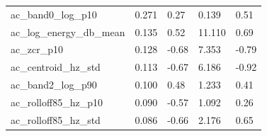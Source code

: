 \documentclass[11pt,a4paper]{article}
\begin{document}
\begin{center}
\begin{longtable}{>{\raggedright\arraybackslash}p{4.20cm}>{\raggedleft\arraybackslash}p{2.55cm}>{\raggedleft\arraybackslash}p{2.55cm}>{\raggedleft\arraybackslash}p{2.55cm}>{\raggedleft\arraybackslash}p{2.55cm}}
\hspace{0pt}ac\_\allowbreak{}band0\_\allowbreak{}log\_\allowbreak{}p10 & \hspace{0pt}0.271 & \hspace{0pt}0.27 & \hspace{0pt}0.139 & \hspace{0pt}0.51\\
\hspace{0pt}ac\_\allowbreak{}log\_\allowbreak{}energy\_\allowbreak{}db\_\allowbreak{}mean & \hspace{0pt}0.135 & \hspace{0pt}0.52 & \hspace{0pt}11.110 & \hspace{0pt}0.69\\
\hspace{0pt}ac\_\allowbreak{}zcr\_\allowbreak{}p10 & \hspace{0pt}0.128 & \hspace{0pt}-0.68 & \hspace{0pt}7.353 & \hspace{0pt}-0.79\\
\hspace{0pt}ac\_\allowbreak{}centroid\_\allowbreak{}hz\_\allowbreak{}std & \hspace{0pt}0.113 & \hspace{0pt}-0.67 & \hspace{0pt}6.186 & \hspace{0pt}-0.92\\
\hspace{0pt}ac\_\allowbreak{}band2\_\allowbreak{}log\_\allowbreak{}p90 & \hspace{0pt}0.100 & \hspace{0pt}0.48 & \hspace{0pt}1.233 & \hspace{0pt}0.41\\
\hspace{0pt}ac\_\allowbreak{}rolloff85\_\allowbreak{}hz\_\allowbreak{}p10 & \hspace{0pt}0.090 & \hspace{0pt}-0.57 & \hspace{0pt}1.092 & \hspace{0pt}0.26\\
\hspace{0pt}ac\_\allowbreak{}rolloff85\_\allowbreak{}hz\_\allowbreak{}std & \hspace{0pt}0.086 & \hspace{0pt}-0.66 & \hspace{0pt}2.176 & \hspace{0pt}0.65\\

\end{longtable}
\end{center}
\end{document}
